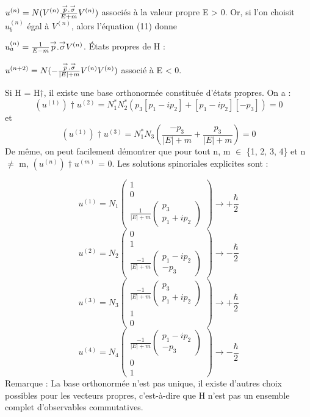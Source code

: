 $u^{(n)}=N(V^{(n)}\frac{{\overset{\rightarrow}{p}}.{\overset{\rightarrow}{\sigma}}}{E+m}V^{(n)} )$
associés à la valeur propre E > 0.
Or, si l’on choisit $u_b^{(n)}$ égal à $V^{(n)}$, alors l’équation (11) donne

$u_a^{(n)}=\frac{1}{E-m}{\overset{\rightarrow}{p}}.{\overset{\rightarrow}{\sigma}}V^{(n)}$. États propres de H : 

$u^{(n+2)}=N(-\frac{{\overset{\rightarrow}{p}}.{\overset{\rightarrow}{\sigma}}}{|E|+m}V^{(n)}V^{(n)})$ associé à E < 0.

Si H = H$\dag$, il existe une base orthonormée constituée d’états propres. On a :
\[
(u^{(1)})\dag u^{(2)}=N_1^*N_2^*(p_3[p_1-ip_2]+[p_1-ip_2][-p_3])=0
\]
et
\[
(u^{(1)})\dag u^{(3)}=N_1^*N_3\left(\frac{-p_3}{|E|+m}+\frac{p_3}{|E|+m}\right)=0
\]
De même, on peut facilement démontrer que pour tout n, m $\in$ \{1, 2, 3, 4\} et n $\neq$ m, $(u^{(n)})\dag u^{(m)}$
= 0.
Les solutions spinoriales explicites sont :

\[u^{(1)}=N_1\begin{pmatrix}1\\0\\
\frac{1}{|E|+m}\begin{pmatrix}p_3\\p_1+ip_2\end{pmatrix}\end{pmatrix}
\to+\frac{\hbar}{2}\]
\[u^{(2)}=N_2\begin{pmatrix}0\\1\\
\frac{-1}{|E|+m}\begin{pmatrix}p_1-ip_2\\-p_3\end{pmatrix}\end{pmatrix}
\to-\frac{\hbar}{2}\]
\[u^{(3)}=N_3\begin{pmatrix}\frac{-1}{|E|+m}\begin{pmatrix}p_3\\
p_1+ip_2\end{pmatrix}\\1\\0\end{pmatrix}
\to+\frac{\hbar}{2}\]
\[u^{(4)}=N_4\begin{pmatrix}\frac{-1}{|E|+m}\begin{pmatrix}
p_1-ip_2\\-p_3\end{pmatrix}\\0\\1\end{pmatrix}
\to-\frac{\hbar}{2}
\]
Remarque : La base orthonormée n’est pas unique, il existe d’autres choix
possibles pour les vecteurs propres, c’est-à-dire que H n’est pas un ensemble
complet d’observables commutatives.

